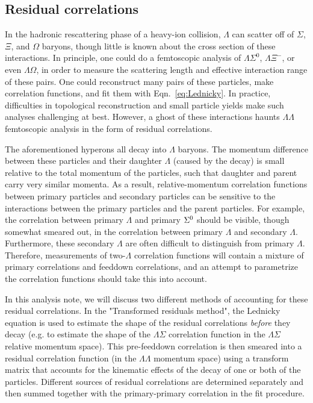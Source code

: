 \subsection{Residual correlations}
\label{sec:Residual}

In the hadronic rescattering phase of a heavy-ion collision, $\Lambda$ can scatter off of $\Sigma$, $\Xi$, and $\Omega$ baryons, though little is known about the cross section of these interactions.  
In principle, one could do a femtoscopic analysis of $\Lambda\Sigma^0$, $\Lambda\Xi^{-}$, or even $\Lambda\Omega$, in order to measure the scattering length and effective interaction range of these pairs. 
One could reconstruct many pairs of these particles, make correlation functions, and fit them with Eqn.\ \ref{eq:Lednicky}.
In practice, difficulties in topological reconstruction and small particle yields make such analyses challenging at best.
However, a ghost of these interactions haunts $\Lambda\Lambda$ femtoscopic analysis in the form of residual correlations.

The aforementioned hyperons all decay into $\Lambda$ baryons.  
The momentum difference between these particles and their daughter $\Lambda$ (caused by the decay) is small relative to the total momentum of the particles, such that daughter and parent carry very similar momenta.  
As a result, relative-momentum correlation functions between primary particles and secondary particles can be sensitive to the interactions between the primary particles and the parent particles.  
For example, the correlation between primary $\Lambda$ and primary $\Sigma^{\rm 0}$ should be visible, though somewhat smeared out, in the correlation between primary $\Lambda$ and secondary $\Lambda$.  
Furthermore, these secondary $\Lambda$ are often difficult to distinguish from primary $\Lambda$.  
Therefore, measurements of two-$\Lambda$ correlation functions will contain a mixture of primary correlations and feeddown correlations, and an attempt to parametrize the correlation functions should take this into account.  

In this analysis note, we will discuss two different methods of accounting for these residual correlations.  
In the "Transformed residuals method", the Lednicky equation is used to estimate the shape of the residual correlations \emph{before} they decay (e.g. to estimate the shape of the $\Lambda\Sigma$ correlation function in the $\Lambda\Sigma$ relative momentum space).  
This pre-feeddown correlation is then smeared into a residual correlation function (in the $\Lambda\Lambda$ momentum space) using a transform matrix that accounts for the kinematic effects of the decay of one or both of the particles.  
Different sources of residual correlations are determined separately and then summed together with the primary-primary correlation in the fit procedure.

